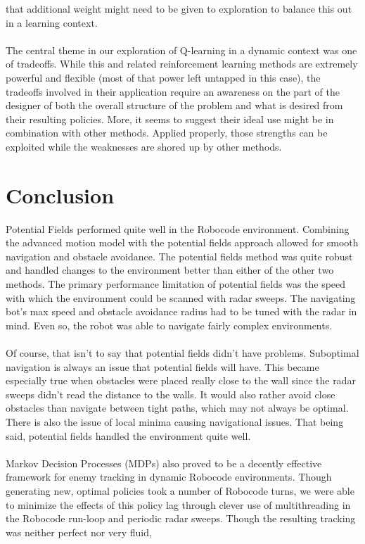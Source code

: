 \documentclass{aiaa-tc}%
\begin{document}
that additional weight might need to be given to exploration to
balance this out in a learning context. \\ \\
The central theme in our exploration of Q-learning in a dynamic
context was one of tradeoffs. While this and related reinforcement
learning methods are extremely powerful and flexible (most of that power
left untapped in this case), the tradeoffs involved in their application require an awareness on the part of the designer of both the overall structure of the problem and what is desired from their resulting policies. More, it 
seems to suggest their ideal use might be in combination with other
methods. Applied properly, those strengths can be exploited while the weaknesses
are shored up by other methods.
\section{Conclusion}
\label{Conclusion}
\noindent
Potential Fields performed quite well in the Robocode environment. Combining the advanced motion model with the potential fields approach allowed for smooth navigation and obstacle avoidance. The potential fields method was quite robust and handled changes to the environment better than either of the other two methods. The primary performance limitation of potential fields was the speed with which the environment could be scanned with radar sweeps. The navigating bot's max speed and obstacle avoidance radius had to be tuned with the radar in mind. Even so, the robot was able to navigate fairly complex environments. \\ \\
Of course, that isn't to say that potential fields didn't have problems. Suboptimal navigation is always an issue that potential fields will have. This became especially true when obstacles were placed really close to the wall since the radar sweeps didn't read the distance to the walls. It would also rather avoid close obstacles than navigate between tight paths, which may not always be optimal. There is also the issue of local minima causing navigational issues. That being said, potential fields handled the environment quite well. \\ \\
Markov Decision Processes (MDPs) also proved to be a decently effective framework for enemy tracking in dynamic Robocode environments. Though generating new, optimal policies took a number of Robocode
turns, we were able to minimize the effects of this policy lag through clever use of multithreading in the Robocode run-loop and periodic radar sweeps. Though the resulting tracking was neither perfect nor very fluid,
\end{document}
